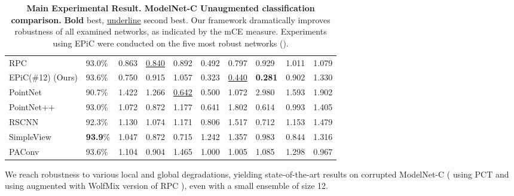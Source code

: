 \documentclass[10pt,twocolumn]{article}
\begin{document}
\begin{table*}
\begin{tabular}{p{3.8cm} || p{1.0cm} p{1.0cm} p{1.0cm} p{1.0cm} p{1.1cm} p{1.1cm} p{1.0cm} p{1.0cm} p{0.8cm}}
    \hline
    RPC\cite{modelnetc} & 93.0\% & 0.863 & \underline{0.840} & 0.892 & 0.492 &  0.797 & 0.929 & 1.011 &  1.079\\
    \hspace*{0.2cm} EPiC(\#12) (Ours)  & 93.6\% & 0.750 & 0.915 & 1.057 & 0.323 & \underline{0.440} & \textbf{0.281} & 0.902 & 1.330\\
    \hline
    PointNet\cite{pointnet} & 90.7\% & 1.422 & 1.266 &  \underline{0.642} & 0.500 & 1.072 & 2.980 & 1.593 & 1.902\\
    PointNet++\cite{pointnet++} & 93.0\% & 1.072 & 0.872 &  1.177 & 0.641 & 1.802 & 0.614 & 0.993 & 1.405\\
    RSCNN\cite{rscnn} & 92.3\% & 1.130 & 1.074 & 1.171 & 0.806 &  1.517 & 0.712 & 1.153 &  1.479\\
    SimpleView\cite{simple_view} & \textbf{93.9}\% & 1.047 & 0.872 & 0.715 & 1.242 &  1.357 & 0.983 & 0.844 &  1.316\\
    PAConv\cite{paconv} & 93.6\% & 1.104 & 0.904 & 1.465 & 1.000 &  1.005 & 1.085 & 1.298 &  0.967\\
\hline
  \end{tabular}
  \caption{{\bf Main Experimental Result. ModelNet-C Unaugmented classification comparison.} {\bf Bold} best, \underline{underline} second best. Our framework dramatically improves robustness of all examined networks, as indicated by the mCE measure. Experiments using EPiC were conducted on the five most robust networks ().  }
  \label{table:comparison_unaugmented}
\end{table*}



We reach robustness to various local and global degradations, yielding state-of-the-art results on corrupted ModelNet-C \cite{modelnetc} ( using PCT\cite{pct} and  using augmented with WolfMix\cite{pointwolf, rsmix} version of RPC \cite{modelnetc}), even with a small ensemble of size 12. 
\end{document}
